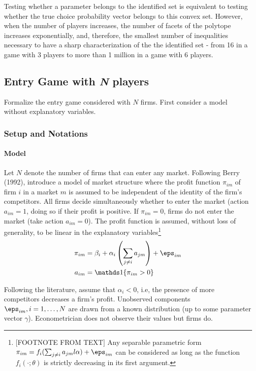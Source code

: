 Testing whether a parameter belongs to the identified set is equivalent to testing whether the true choice probability vector belongs to this convex set. However, when the number of players increases, the number of facets of the polytope increases exponentially, and, therefore, the smallest number of inequalities necessary to have a sharp characterization of the the identified set - from 16 in a game with 3 players to more than 1 million in a game with 6 players.

\subsection{Entry Game with \emph{N} players}

Formalize the entry game considered with $N$ firms. First consider a model without explanatory variables.

\subsubsection{Setup and Notations}

\paragraph{Model}
Let $N$ denote the number of firms that can enter any market. Following Berry (1992), introduce a model of market structure where the profit function $\pi_{im}$ of firm $i$ in a market $m$ is assumed to be independent of the identity of the firm's competitors. All firms decide simultaneously whether to enter the market (action \(a_{im} = 1\), doing so if their profit is positive. If $\pi_{im} = 0$, firms do not enter the market (take action \(a_{im}= 0\)). The profit function is assumed, without loss of generality, to be linear in the explanatory variables\footnote{[FOOTNOTE FROM TEXT] Any separable parametric form $\pi_{im} = f_i(\sum_{j\neq i} a_{jm}l\alpha) + \eps_{im}$ can be considered as long as the function $f_i(\cdot;\theta)$ is strictly decreasing in its first argument.}
\begin{equation}
	\label{eq:BK-1}
	\begin{split}
    	\pi_{im} &= \beta_i + \alpha_i \left(\sum_{j\neq i}a_{jm}\right) + \eps_{im} \\
    	a_{im} &= \ind\{\pi_{im} > 0\}
	\end{split}
\end{equation}


Following the literature, assume that $\alpha_i < 0$, i.e, the presence of more competitors decreases a firm's profit. Unobserved components $\eps_{im}, i = 1,\dots, N$ are drawn from a known distribution (up to some parameter vector $\gamma$). Econometrician does not observe their values but firms do.

